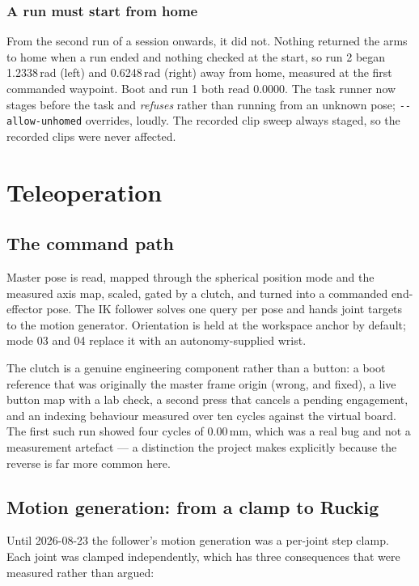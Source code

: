\documentclass[11pt,a4paper,oneside]{report}
\newcommand{\code}[1]{\texttt{\small #1}}
\begin{document}
\subsection{A run must start from home}

From the second run of a session onwards, it did not. Nothing returned the arms
to home when a run ended and nothing checked at the start, so run 2 began
1.2338\,rad (left) and 0.6248\,rad (right) away from home, measured at the first
commanded waypoint. Boot and run 1 both read 0.0000. The task runner now stages
before the task and \emph{refuses} rather than running from an unknown pose;
\code{-{}-allow-unhomed} overrides, loudly. The recorded clip sweep always
staged, so the recorded clips were never affected.

\chapter{Teleoperation}

\section{The command path}

Master pose is read, mapped through the spherical position mode and the
measured axis map, scaled, gated by a clutch, and turned into a commanded
end-effector pose. The IK follower solves one query per pose and hands joint
targets to the motion generator. Orientation is held at the workspace anchor by
default; mode 03 and 04 replace it with an autonomy-supplied wrist.

The clutch is a genuine engineering component rather than a button: a boot
reference that was originally the master frame origin (wrong, and fixed), a
live button map with a lab check, a second press that cancels a pending
engagement, and an indexing behaviour measured over ten cycles against the
virtual board. The first such run showed four cycles of 0.00\,mm, which was a
real bug and not a measurement artefact --- a distinction the project makes
explicitly because the reverse is far more common here.

\section{Motion generation: from a clamp to Ruckig}

Until 2026-08-23 the follower's motion generation was a per-joint step clamp.
Each joint was clamped independently, which has three consequences that were
measured rather than argued:
\end{document}
